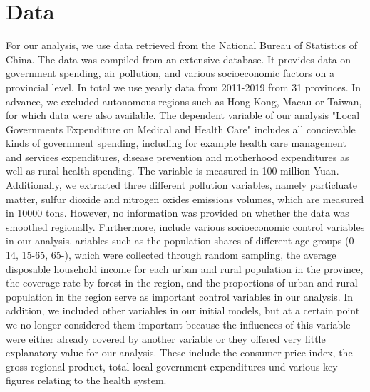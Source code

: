 \documentclass[]{article}
\begin{document}
\section{Data} \label{Data}

For our analysis, we use data retrieved from the National Bureau of Statistics of China. The data was compiled from an extensive database. It provides data on government spending, air pollution, and various socioeconomic factors on a provincial level. In total we use yearly data from 2011-2019 from 31 provinces. In advance, we excluded autonomous regions such as Hong Kong, Macau or Taiwan, for which data were also available. The dependent variable of our analysis "Local Governments Expenditure on Medical and Health Care" includes all concievable kinds of government spending, including for example health care management and services expenditures, disease prevention and motherhood expenditures as well as rural health spending. The variable is measured in 100 million Yuan. Additionally, we extracted three different pollution variables, namely particluate matter, sulfur dioxide and nitrogen oxides emissions volumes, which are measured in 10000 tons. However, no information was provided on whether the data was smoothed regionally. Furthermore, include various socioeconomic control variables in our analysis. ariables such as the population shares of different age groups (0-14, 15-65, 65-), which were collected through random sampling, the average disposable household income for each urban and rural population in the province, the coverage rate by forest in the region, and the proportions of urban and rural population in the region serve as important control variables in our analysis. 
In addition, we included other variables in our initial models, but at a certain point we no longer considered them important because the influences of this variable were either already covered by another variable or they offered very little explanatory value for our analysis. These include the consumer price index, the gross regional product, total local government expenditures und various key figures relating to the health system.
\end{document}
